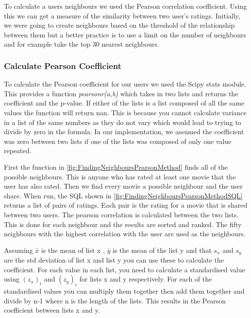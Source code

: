                     
                    To calculate a users neighbours we used the Pearson correlation coefficient. Using this we can get a measure of the similarity between two user's ratings. Initially, we were going to create neighbours based on the threshold of the relationship between them but a better practice is to use a limit on the number of neighbours and for example take the top 30 nearest neighbours. \label{sec:CreateNeighbours}

                    \subsubsection{Calculate Pearson Coefficient}
                
                        To calculate the Pearson coefficient for our users we used the Scipy stats module. This provides a function \textit{pearsonr(a,b)} which takes in two lists and returns the coefficient and the p-value. If either of the lists is a list composed of all the same values the function will return nan. This is because you cannot calculate variance in a list of the same numbers as they do not vary which would lead to trying to divide by zero in the formula. In our implementation, we assumed the coefficient was zero between two lists if one of the lists was composed of only one value repeated.
                        
                        First the function in \ref{fig:FindingNeighboursPearsonMethod} finds all of the possible neighbours. This is anyone who has rated at least one movie that the user has also rated. Then we find every movie a possible neighbour and the user share. When run, the SQL shown in \ref{fig:FindingNeighboursPearsonMethodSQL} returns a list of pairs of ratings. Each pair is the rating for a movie that is shared between two users. The pearson correlation is calculated between the two lists. This is done for each neighbour and the results are sorted and ranked. The fifty neighbours with the highest correlation with the user are used as the neighbours.

                        Assuming $\bar{x}$ is the mean of list x , $\bar{y}$ is the mean of the list y and that $s_x$ and $s_y$ are the std deviation of list x and list y you can use these to calculate the coefficient. For each value in each list, you need to calculate a standardised value using $(z_x)_i$ and $(z_y)_i$ for lists x and y respectively. For  each of the standardised values you can multiply them together then add them together and divide by n-1 where n is the length of the lists. This results in the Pearson coefficient between lists x and y.

